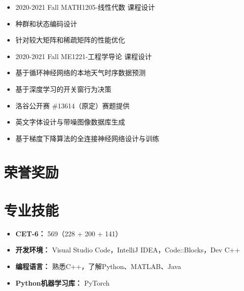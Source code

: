 \documentclass{resume}
\begin{document}
\begin{itemize}[parsep=0.5ex]
  \item 2020-2021 Fall MATH1205-线性代数 课程设计
  \item 种群和状态编码设计
  \item 针对较大矩阵和稀疏矩阵的性能优化
\end{itemize}

\begin{itemize}[parsep=0.5ex]
  \item 2020-2021 Fall ME1221-工程学导论 课程设计
  \item 基于循环神经网络的本地天气时序数据预测
  \item 基于深度学习的开关窗行为决策
\end{itemize}

\begin{itemize}[parsep=0.5ex]
  \item 洛谷公开赛 \#13614（原定）赛题提供
  \item 英文字体设计与带噪图像数据库生成
  \item 基于梯度下降算法的全连接神经网络设计与训练
\end{itemize}
\section{荣誉奖励}


\section{专业技能}

\begin{itemize}[parsep=0.5ex]
  \item \textbf{CET-6：} 569（228 + 200 + 141）
  \item \textbf{开发环境：} Visual Studio Code，IntelliJ IDEA，Code::Blocks，Dev C++
  \item \textbf{编程语言：} 熟悉C++，了解Python、MATLAB、Java
  \item \textbf{Python机器学习库：} PyTorch
\end{itemize}
\end{document}
